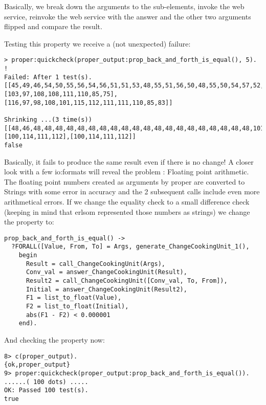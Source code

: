 \documentclass[11pt]{article} %
\begin{document}
Basically, we break down the arguments to the sub-elements, invoke the web service, reinvoke the web service with the answer and the other two arguments flipped and compare the result. 

Testing this property we receive a (not unexpected) failure:

\begin{lstlisting}
> proper:quickcheck(proper_output:prop_back_and_forth_is_equal(), 5).
!
Failed: After 1 test(s).
[[45,49,46,54,50,55,56,54,56,51,51,53,48,55,51,56,50,48,55,50,54,57,52,101,45,48,49],[103,97,108,108,111,110,85,75],[116,97,98,108,101,115,112,111,111,110,85,83]]

Shrinking ...(3 time(s))
[[48,46,48,48,48,48,48,48,48,48,48,48,48,48,48,48,48,48,48,48,48,48,101,43,48,48],[100,114,111,112],[100,114,111,112]]
false
\end{lstlisting}

Basically, it fails to produce the same result even if there is no change! A closer look with a few io:formats will reveal the problem : Floating point arithmetic. The floating point numbers created as arguments by proper are converted to Strings with some error in accuracy and the 2 subsequent calls include even more arithmetical errors. If we change the equality check to a small difference check (keeping in mind that erlsom represented those numbers as strings) we change the property to:

\begin{lstlisting}
prop_back_and_forth_is_equal() ->
  ?FORALL([Value, From, To] = Args, generate_ChangeCookingUnit_1(),
    begin
      Result = call_ChangeCookingUnit(Args),
      Conv_val = answer_ChangeCookingUnit(Result),
      Result2 = call_ChangeCookingUnit([Conv_val, To, From]),
      Initial = answer_ChangeCookingUnit(Result2),
      F1 = list_to_float(Value),
      F2 = list_to_float(Initial),
      abs(F1 - F2) < 0.000001
    end).
\end{lstlisting}

And checking the property now:

\begin{lstlisting}
8> c(proper_output).                                                  
{ok,proper_output}
9> proper:quickcheck(proper_output:prop_back_and_forth_is_equal()).
......( 100 dots) .....
OK: Passed 100 test(s).
true
\end{lstlisting}
\end{document}
